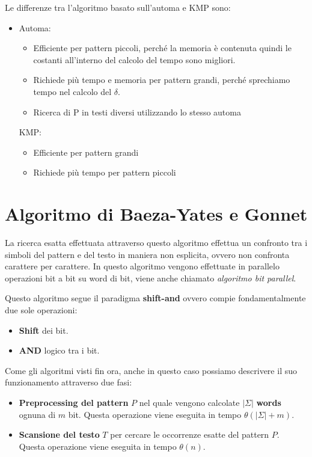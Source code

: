 Le differenze tra l'algoritmo basato sull'automa e KMP sono:
\begin{itemize}
    \item Automa:
          \begin{itemize}
              \item Efficiente per pattern piccoli, perché la memoria è contenuta
                    quindi le costanti all'interno del calcolo del tempo sono migliori.
              \item Richiede più tempo e memoria per pattern grandi, perché sprechiamo
                    tempo nel calcolo del $\delta$.
              \item Ricerca di P in testi diversi utilizzando lo stesso automa
          \end{itemize}
          KMP:
          \begin{itemize}
              \item Efficiente per pattern grandi
              \item Richiede più tempo per pattern piccoli
          \end{itemize}
\end{itemize}
\section{Algoritmo di Baeza-Yates e Gonnet}
La ricerca esatta effettuata attraverso questo algoritmo effettua un confronto
tra i simboli del pattern e del testo in maniera non esplicita, ovvero non confronta
carattere per carattere. In questo algoritmo vengono effettuate in parallelo operazioni
bit a bit su word di bit, viene anche chiamato \textit{algoritmo bit parallel}.

Questo algoritmo segue il paradigma \textbf{shift-and} ovvero compie fondamentalmente
due sole operazioni:
\begin{itemize}
    \item \textbf{Shift} dei bit.
    \item \textbf{AND} logico tra i bit.
\end{itemize}
Come gli algoritmi visti fin ora, anche in questo caso possiamo descrivere il suo
funzionamento attraverso due fasi:
\begin{itemize}
    \item \textbf{Preprocessing del pattern} $P$ nel quale vengono calcolate
          $|\Sigma|$ \textbf{words} ognuna di $m$ bit. Questa operazione viene eseguita
          in tempo $\theta(|\Sigma| + m)$.
    \item \textbf{Scansione del testo} $T$ per cercare le occorrenze esatte del
          pattern $P$. Questa operazione viene eseguita in tempo $\theta(n)$.
\end{itemize}
